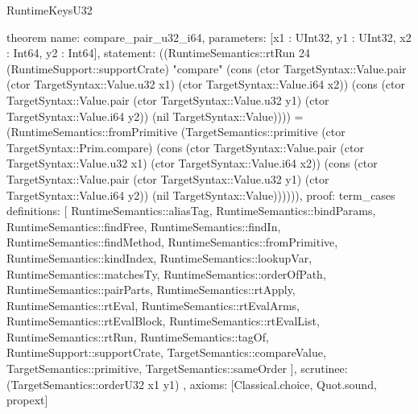 \begin{lexlean}{RuntimeKeysU32}
\begin{semanticmodule}
theorem{
  name: compare_pair_u32_i64,
  parameters: [x1 : UInt32, y1 : UInt32, x2 : Int64, y2 : Int64],
  statement: ((RuntimeSemantics::rtRun 24 (RuntimeSupport::supportCrate) "compare" (cons (ctor TargetSyntax::Value.pair (ctor TargetSyntax::Value.u32 x1) (ctor TargetSyntax::Value.i64 x2)) (cons (ctor TargetSyntax::Value.pair (ctor TargetSyntax::Value.u32 y1) (ctor TargetSyntax::Value.i64 y2)) (nil TargetSyntax::Value)))) = (RuntimeSemantics::fromPrimitive (TargetSemantics::primitive (ctor TargetSyntax::Prim.compare) (cons (ctor TargetSyntax::Value.pair (ctor TargetSyntax::Value.u32 x1) (ctor TargetSyntax::Value.i64 x2)) (cons (ctor TargetSyntax::Value.pair (ctor TargetSyntax::Value.u32 y1) (ctor TargetSyntax::Value.i64 y2)) (nil TargetSyntax::Value)))))),
  proof: term_cases{
    definitions: [
      RuntimeSemantics::aliasTag,
      RuntimeSemantics::bindParams,
      RuntimeSemantics::findFree,
      RuntimeSemantics::findIn,
      RuntimeSemantics::findMethod,
      RuntimeSemantics::fromPrimitive,
      RuntimeSemantics::kindIndex,
      RuntimeSemantics::lookupVar,
      RuntimeSemantics::matchesTy,
      RuntimeSemantics::orderOfPath,
      RuntimeSemantics::pairParts,
      RuntimeSemantics::rtApply,
      RuntimeSemantics::rtEval,
      RuntimeSemantics::rtEvalArms,
      RuntimeSemantics::rtEvalBlock,
      RuntimeSemantics::rtEvalList,
      RuntimeSemantics::rtRun,
      RuntimeSemantics::tagOf,
      RuntimeSupport::supportCrate,
      TargetSemantics::compareValue,
      TargetSemantics::primitive,
      TargetSemantics::sameOrder
    ],
    scrutinee: (TargetSemantics::orderU32 x1 y1)
  },
  axioms: [Classical.choice, Quot.sound, propext]
}
\end{semanticmodule}
\end{lexlean}
